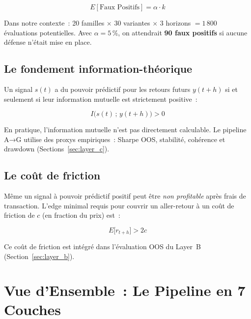\begin{equation}
E\left[\text{Faux Positifs}\right] = \alpha \cdot k
\label{eq:faux_pos_ch2}
\end{equation}

Dans notre contexte~: 20 familles $\times$ 30 variantes $\times$ 3 horizons $= 1\,800$
évaluations potentielles. Avec $\alpha = 5\,\%$, on attendrait \textbf{90 faux positifs}
si aucune défense n'était mise en place.

\subsection{Le fondement information-théorique}

Un signal $s(t)$ a du pouvoir prédictif pour les retours futurs $y(t+h)$ si et
seulement si leur information mutuelle est strictement positive~:

\begin{equation}
I\bigl(s(t)\,;\,y(t+h)\bigr) > 0
\label{eq:info_mutuelle}
\end{equation}

En pratique, l'information mutuelle n'est pas directement calculable. Le pipeline
A→G utilise des proxys empiriques~: Sharpe OOS, stabilité, cohérence et drawdown
(Sections~\ref{sec:layer_c}).

\subsection{Le coût de friction}

Même un signal à pouvoir prédictif positif peut être \emph{non profitable} après
frais de transaction. L'edge minimal requis pour couvrir un aller-retour à un
coût de friction de $c$ (en fraction du prix) est~:

\begin{equation}
E\bigl[r_{t+h}\bigr] > 2c
\label{eq:edge_minimal}
\end{equation}

Ce coût de friction est intégré dans l'évaluation OOS du Layer~B (Section~\ref{sec:layer_b}).

\section{Vue d'Ensemble~: Le Pipeline en 7 Couches}
\label{sec:pipeline_vue}

